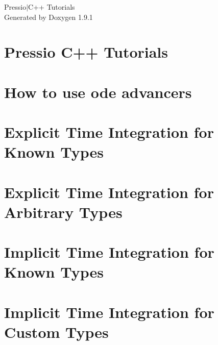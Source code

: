 \let\mypdfximage\pdfximage\def\pdfximage{\immediate\mypdfximage}\documentclass[twoside]{book}
\newcommand{\+}{\discretionary{\mbox{\scriptsize$\hookleftarrow$}}{}{}}
\newcommand{\clearemptydoublepage}{%
  \newpage{\pagestyle{empty}\cleardoublepage}%
}
\begin{document}
\raggedbottom

\hypersetup{pageanchor=false,
             bookmarksnumbered=true,
             pdfencoding=unicode
            }
\begin{titlepage}
\vspace*{7cm}
\begin{center}%
{\Large Pressio$\vert$\+C++ Tutorials }\\
\vspace*{1cm}
{\large Generated by Doxygen 1.9.1}\\
\end{center}
\end{titlepage}
\clearemptydoublepage
{}
\tableofcontents
\clearemptydoublepage
{}
\hypersetup{pageanchor=true}

\chapter{Pressio C++ Tutorials}
\label{index}\hypertarget{index}{}
\chapter{How to use ode advancers}
\label{md_pages_ode_advancers}

\chapter{Explicit Time Integration for Known Types}
\label{md_pages_ode_steppers_tutorial1}

\chapter{Explicit Time Integration for Arbitrary Types}
\label{md_pages_ode_steppers_tutorial2}

\chapter{Implicit Time Integration for Known Types}
\label{md_pages_ode_steppers_tutorial3}

\chapter{Implicit Time Integration for Custom Types}
\label{md_pages_ode_steppers_tutorial4}

\end{document}
